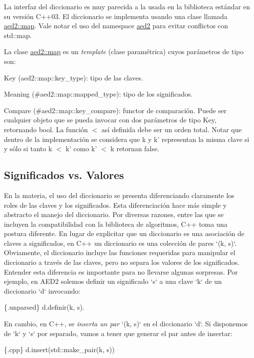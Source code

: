 \-La interfaz del diccionario es muy parecida a la usada en la biblioteca estándar en su versión \-C++03. \-El diccionario se implementa usando una clase llamada \hyperlink{classaed2_1_1map}{aed2\-::map}. \-Vale notar el uso del namespace \hyperlink{namespaceaed2}{aed2} para evitar conflictos con std\-::map.

\-La clase \hyperlink{classaed2_1_1map}{aed2\-::map} es un {\itshape template\/} (clase paramétrica) cuyos parámetros de tipo son\-:
\begin{DoxyItemize}
\item \-Key (aed2\-::map\-::key\-\_\-type)\-: tipo de las claves.
\item \-Meaning (\#aed2\-::map\-::mapped\-\_\-type)\-: tipo de los significados.
\item \-Compare (\#aed2\-::map\-::key\-\_\-compare)\-: functor de comparación. \-Puede ser cualquier objeto que se pueda invocar con dos parámetros de tipo \-Key, retornando {\ttfamily bool}. \-La función $<$ así definida debe ser un orden total. \-Notar que dentro de la implementación se considera que {\ttfamily k} y {\ttfamily k'} representan la misma clave si y sólo si tanto {\ttfamily k} $<$ {\ttfamily k'} como {\ttfamily k'} $<$ {\ttfamily k} retornan {\ttfamily false}.
\end{DoxyItemize}\hypertarget{Interfaz_Diferencias}{}\subsection{\-Significados vs. Valores}\label{Interfaz_Diferencias}
\-En la materia, el uso del diccionario se presenta diferenciando claramente los roles de las claves y los significados. \-Esta diferenciación hace más simple y abstracto el manejo del diccionario. \-Por diversas razones, entre las que se incluyen la compatibilidad con la biblioteca de algoritmos, \-C++ toma una postura diferente. \-En lugar de explicitar que un diccionario es una asociación de claves a significados, en \-C++ un diccionario es una colección de pares `(k, s)`. \-Obviamente, el diccionario incluye las funciones requeridas para manipular el diccionario a través de las claves, pero no separa los valores de los significados. \-Entender esta diferencia es importante para no llevarse algunas sorpresas. \-Por ejemplo, en \-A\-E\-D2 solemos definir un significado `s` a una clave `k` de un diccionario `d` invocando\-: 
\begin{DoxyCode}
 \{.unparsed\}
 d.definir(k, s).
\end{DoxyCode}
 \-En cambio, en \-C++, se {\itshape inserta un par\/} `(k, s)` en el diccionario `d`. \-Si disponemos de `k` y `s` por separado, vamos a tener que generar el par antes de insertar\-: 
\begin{DoxyCode}
 \{.cpp\}
 d.insert(std::make\_pair(k, s))
\end{DoxyCode}


